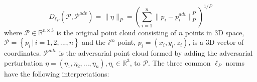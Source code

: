 \documentclass{ieeeaccess}
\begin{document}
\begin{equation}
 D_{\ell_P}  (\mathcal{P} , \mathcal{P}^{adv}) = \|\eta\|_P =  \left(\sum_{i=1}^n\|p_i - p^{adv}_i\|_P^P\right)^{1/P}
\label{eq:12}
\end{equation}
where $\mathcal{P} \in \mathbb{R}^{n\times3}$ is the original point cloud consisting of $n$ points in 3D space, $\mathcal{P}=\left\{p_{i}\,|\, i=1,2, ..., n\right\}$ and the $i^{th}$ point, $p_{i} = (x_i,y_i,z_i)$, is a 3D vector of coordinates. %
$\mathcal{P}^{adv}$ is the adversarial point cloud formed by adding the adversarial perturbation $\eta = (\eta_1,\eta_2, ..., \eta_n), \eta_i\in \mathbb{R}^3$, to $\mathcal{P}$. %
The three common $\ell_P$ norms have the following interpretations:
\end{document}
